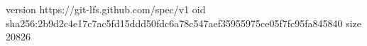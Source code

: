 version https://git-lfs.github.com/spec/v1
oid sha256:2b9d2c4e17c7ac5fd15ddd50fdc6a78c547aef35955975ce05f7fc95fa845840
size 20826
